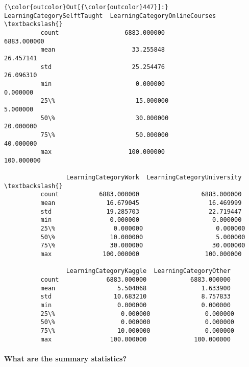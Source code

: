 \documentclass[11pt]{article}
\begin{document}
\begin{Verbatim}[commandchars=\\\{\}]
{\color{outcolor}Out[{\color{outcolor}447}]:}        LearningCategorySelftTaught  LearningCategoryOnlineCourses  \textbackslash{}
          count                  6883.000000                    6883.000000   
          mean                     33.255848                      26.457141   
          std                      25.254476                      26.096310   
          min                       0.000000                       0.000000   
          25\%                      15.000000                       5.000000   
          50\%                      30.000000                      20.000000   
          75\%                      50.000000                      40.000000   
          max                     100.000000                     100.000000   
          
                 LearningCategoryWork  LearningCategoryUniversity  \textbackslash{}
          count           6883.000000                 6883.000000   
          mean              16.679045                   16.469999   
          std               19.285703                   22.719447   
          min                0.000000                    0.000000   
          25\%                0.000000                    0.000000   
          50\%               10.000000                    5.000000   
          75\%               30.000000                   30.000000   
          max              100.000000                  100.000000   
          
                 LearningCategoryKaggle  LearningCategoryOther  
          count             6883.000000            6883.000000  
          mean                 5.504068               1.633900  
          std                 10.683210               8.757833  
          min                  0.000000               0.000000  
          25\%                  0.000000               0.000000  
          50\%                  0.000000               0.000000  
          75\%                 10.000000               0.000000  
          max                100.000000             100.000000  
\end{Verbatim}
            
    \paragraph{What are the summary
statistics?}\label{what-are-the-summary-statistics}
\end{document}
